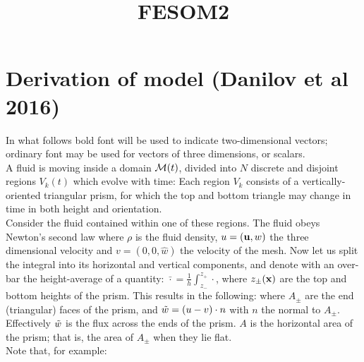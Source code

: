 \documentclass[10pt]{article}
\begin{document}
\title{FESOM2}
\date{}
\maketitle
\section{Derivation of model (Danilov et al 2016)}
In what follows bold font will be used to indicate two-dimensional vectors; ordinary font may be used for vectors of three dimensions, or scalars.\\
A fluid is moving inside a domain $\mathcal{M}(t)$, divided into $N$ discrete and disjoint regions $V_{k}(t)$ which evolve with time:
Each region $V_{k}$ consists of a vertically-oriented triangular prism, for which the top and bottom triangle may change in time in both height and orientation. \\
Consider the fluid contained within one of these regions. The fluid obeys Newton's second law
	where $\rho$ is the fluid density, $u = (\mathbf{u},w)$ the three dimensional velocity and $v = (0,0,\hat{w})$ the velocity of the mesh. Now let us split the integral into its horizontal and vertical components, and denote with an over-bar the height-average of a quantity: $\bar{\cdot} = \frac{1}{h} \int_{z_{-}}^{z_{+}} \cdot$, where $z_{\pm}(\mathbf{x})$ are the top and bottom heights of the prism. This results in the following:
where $A_{\pm}$ are the end (triangular) faces of the prism, and $\tilde{w} = (u -v)\cdot n$ with $n$ the normal to $A_{\pm}$. Effectively $\tilde{w}$ is the flux across the ends of the prism. $A$ is the horizontal area of the prism; that is, the area of $A_{\pm}$ when they lie flat.  \\
\linebreak
Note that, for example:
\end{document}
